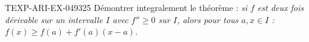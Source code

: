 \begin{exercice}{TEXP-ARI-EX-049}{3}{25}
Démontrer integralement le théorème : \emph{si $f$ est deux fois dérivable sur un intervalle $I$ avec $f'' \geq 0$ sur $I$, alors pour tous $a, x \in I$ : $f(x) \geq f(a) + f'(a)(x - a)$.}

\end{exercice}
